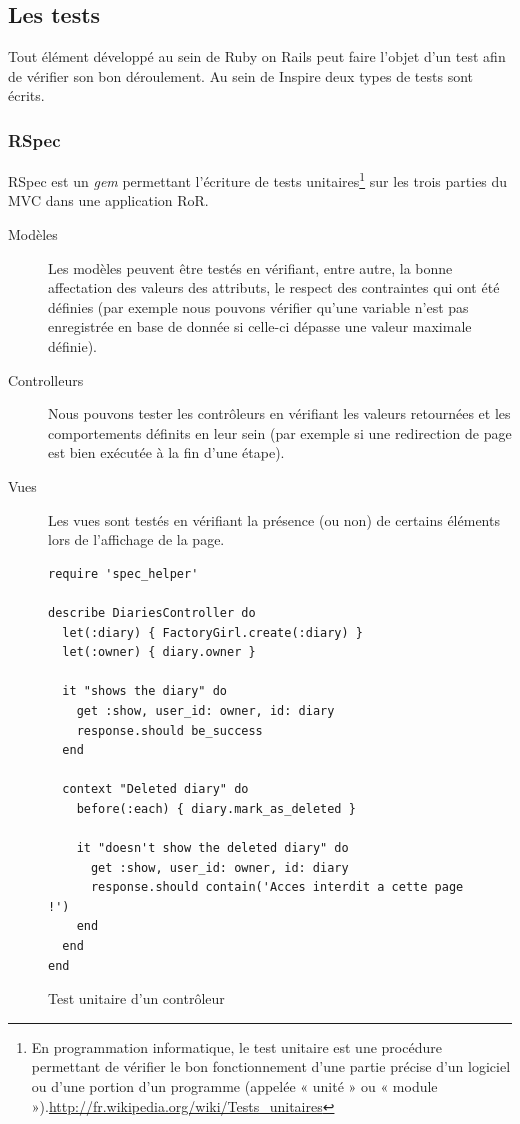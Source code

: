 \documentclass[12pt,a4paper]{book}
\begin{document}
\subsection{Les tests}

\label{sec.tests}

Tout élément développé au sein de Ruby on Rails peut faire l'objet d'un test afin de vérifier son bon déroulement. Au sein de Inspire deux types de tests sont écrits.

\subsubsection{RSpec}

RSpec est un \textit{gem} permettant l'écriture de tests unitaires\footnote{En programmation informatique, le test unitaire est une procédure permettant de vérifier le bon fonctionnement d'une partie précise d'un logiciel ou d'une portion d'un programme (appelée « unité » ou « module »).\url{http://fr.wikipedia.org/wiki/Tests_unitaires}} sur les trois parties du MVC dans une application RoR.
\begin{description}
	\item[Modèles] Les modèles peuvent être testés en vérifiant, entre autre, la bonne affectation des valeurs des attributs, le respect des contraintes qui ont été définies (par exemple nous pouvons vérifier qu'une variable n'est pas enregistrée en base de donnée si celle-ci dépasse une valeur maximale définie).
	\item[Controlleurs] Nous pouvons tester les contrôleurs en vérifiant les valeurs retournées et les comportements définits en leur sein (par exemple si une redirection de page est bien exécutée à la fin d'une étape).
	\item[Vues] Les vues sont testés en vérifiant la présence (ou non) de certains éléments lors de l'affichage de la page. 
\end{description}

\begin{figure}[h]
\lstset{language=ruby}
\begin{lstlisting}
require 'spec_helper'

describe DiariesController do
  let(:diary) { FactoryGirl.create(:diary) }
  let(:owner) { diary.owner }

  it "shows the diary" do
    get :show, user_id: owner, id: diary
    response.should be_success
  end

  context "Deleted diary" do
    before(:each) { diary.mark_as_deleted }

    it "doesn't show the deleted diary" do
      get :show, user_id: owner, id: diary
      response.should contain('Acces interdit a cette page !')
    end
  end
end
\end{lstlisting}
 \caption{Test unitaire d'un contrôleur}
\end{figure}
\end{document}
